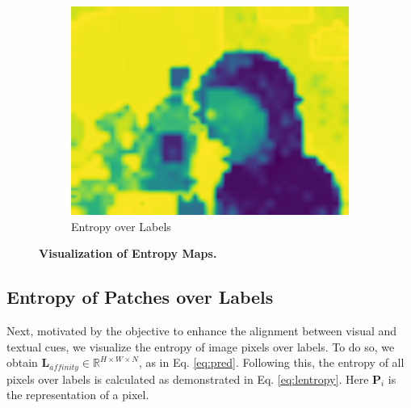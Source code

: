\begin{figure}[t]
\begin{subfigure}{0.32\textwidth}
\label{fig:entropyacrossgroups}
\end{subfigure}
\hfill
\begin{subfigure}{0.32\textwidth}
    \centering
    \includegraphics[width=\linewidth]{Images/entropymaps/class_entropywithoutcb.pdf}
    \caption{Entropy over Labels}
\label{fig:entropyacrosslabels}
\end{subfigure}

\caption[\textbf{GroupViT: Visualization of Entropy Maps}]{\textbf{  Visualization of Entropy Maps.}}
\label{fig:visentropy}
\end{figure}


\subsection{Entropy of Patches over Labels}
\label{sec:LE}



Next, motivated by the objective to enhance the alignment between visual and textual cues, we visualize the entropy of image pixels over labels. 
To do so, we obtain $\textbf{L}_{affinity} \in \mathbb{R}^{ H \times W \times N }$, as in Eq. \ref{eq:pred}. Following this, the entropy of all pixels over labels is calculated as demonstrated in Eq. \ref{eq:lentropy}. Here $\textbf{P}_i$ is the representation of a pixel.


